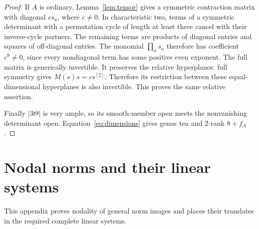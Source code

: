 \documentclass[11pt]{article}
\theoremstyle{definition}\newtheorem{definition}[theorem]{Definition}
\theoremstyle{remark}\newtheorem{remark}[theorem]{Remark}
\begin{document}
\begin{proof}
If $A$ is ordinary, Lemma~\ref{lem:tensor} gives a symmetric contraction matrix with diagonal $c s_a$, where $c\ne0$. In characteristic two, terms of a symmetric determinant with a permutation cycle of length at least three cancel with their inverse-cycle partners. The remaining terms are products of diagonal entries and squares of off-diagonal entries. The monomial $\prod_as_a$ therefore has coefficient $c^9\ne0$, since every nondiagonal term has some positive even exponent. The full matrix is generically invertible. It preserves the relative hyperplanes: full symmetry gives $M(s)s=c s^{[2]}$. Therefore its restriction between these equal-dimensional hyperplanes is also invertible. This proves the same relative assertion.

Finally $|3\Theta|$ is very ample, so its smooth-member open meets the nonvanishing determinant open. Equation~\eqref{eq:dimensions} gives genus ten and $2$-rank $8+f_A$.
\end{proof}


\section{Nodal norms and their linear systems}

This appendix proves nodality of general norm images and places their translates in the required complete linear systems.
\end{document}
